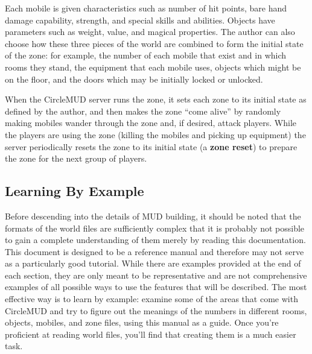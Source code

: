 \documentclass[11pt]{article}
\begin{document}
\par
Each mobile is given characteristics such as number of hit points, bare hand damage capability, strength, and special skills and abilities.  Objects have parameters such as weight, value, and magical properties.  The author can also choose how these three pieces of the world are combined to form the initial state of the zone: for example, the number of each mobile that exist and in which rooms they stand, the equipment that each mobile uses, objects which might be on the floor, and the doors which may be initially locked or unlocked. 
\par
When the CircleMUD server runs the zone, it sets each zone to its initial state as defined by the author, and then makes the zone ``come alive'' by randomly making mobiles wander through the zone and, if desired, attack players.  While the players are using the zone (killing the mobiles and picking up equipment) the server periodically resets the zone to its initial state (a {\bf zone reset}) to prepare the zone for the next group of players. 

\subsection{Learning By Example}
Before descending into the details of MUD building, it should be noted that the formats of the world files are sufficiently complex that it is probably not possible to gain a complete understanding of them merely by reading this documentation.  This document is designed to be a reference manual and therefore may not serve as a particularly good tutorial.  While there are examples provided at the end of each section, they are only meant to be representative and are not comprehensive examples of all possible ways to use the features that will be described.  The most effective way is to learn by example: examine some of the areas that come with CircleMUD and try to figure out the meanings of the numbers in different rooms, objects, mobiles, and zone files, using this manual as a guide.  Once you're proficient at reading world files, you'll find that creating them is a much easier task. 
\end{document}
